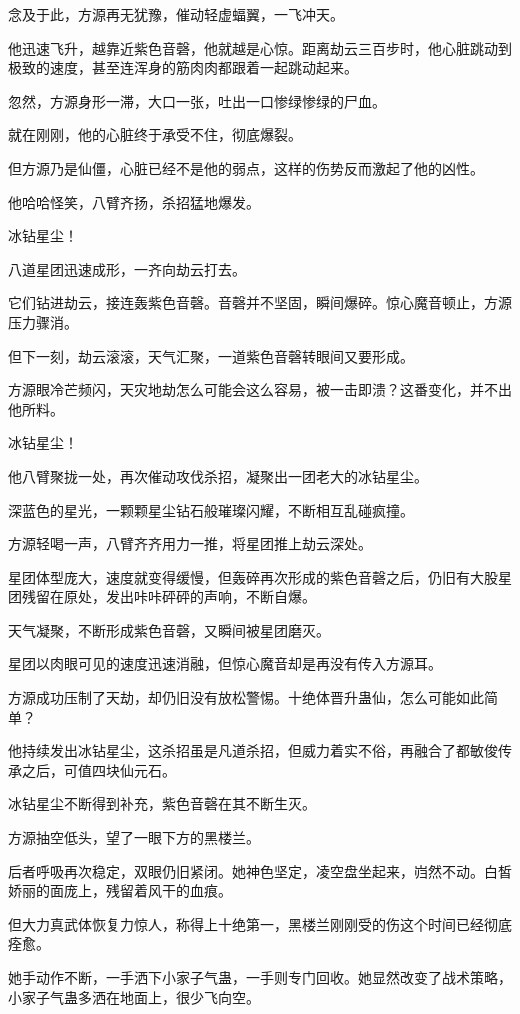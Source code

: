 \begin{this_body}
念及于此，方源再无犹豫，催动轻虚蝠翼，一飞冲天。

他迅速飞升，越靠近紫色音磬，他就越是心惊。距离劫云三百步时，他心脏跳动到极致的速度，甚至连浑身的筋肉肉都跟着一起跳动起来。

忽然，方源身形一滞，大口一张，吐出一口惨绿惨绿的尸血。

就在刚刚，他的心脏终于承受不住，彻底爆裂。

但方源乃是仙僵，心脏已经不是他的弱点，这样的伤势反而激起了他的凶性。

他哈哈怪笑，八臂齐扬，杀招猛地爆发。

冰钻星尘！

八道星团迅速成形，一齐向劫云打去。

它们钻进劫云，接连轰紫色音磬。音磬并不坚固，瞬间爆碎。惊心魔音顿止，方源压力骤消。

但下一刻，劫云滚滚，天气汇聚，一道紫色音磬转眼间又要形成。

方源眼冷芒频闪，天灾地劫怎么可能会这么容易，被一击即溃？这番变化，并不出他所料。

冰钻星尘！

他八臂聚拢一处，再次催动攻伐杀招，凝聚出一团老大的冰钻星尘。

深蓝色的星光，一颗颗星尘钻石般璀璨闪耀，不断相互乱碰疯撞。

方源轻喝一声，八臂齐齐用力一推，将星团推上劫云深处。

星团体型庞大，速度就变得缓慢，但轰碎再次形成的紫色音磬之后，仍旧有大股星团残留在原处，发出咔咔砰砰的声响，不断自爆。

天气凝聚，不断形成紫色音磬，又瞬间被星团磨灭。

星团以肉眼可见的速度迅速消融，但惊心魔音却是再没有传入方源耳。

方源成功压制了天劫，却仍旧没有放松警惕。十绝体晋升蛊仙，怎么可能如此简单？

他持续发出冰钻星尘，这杀招虽是凡道杀招，但威力着实不俗，再融合了都敏俊传承之后，可值四块仙元石。

冰钻星尘不断得到补充，紫色音磬在其不断生灭。

方源抽空低头，望了一眼下方的黑楼兰。

后者呼吸再次稳定，双眼仍旧紧闭。她神色坚定，凌空盘坐起来，岿然不动。白皙娇丽的面庞上，残留着风干的血痕。

但大力真武体恢复力惊人，称得上十绝第一，黑楼兰刚刚受的伤这个时间已经彻底痊愈。

她手动作不断，一手洒下小家子气蛊，一手则专门回收。她显然改变了战术策略，小家子气蛊多洒在地面上，很少飞向空。


\end{this_body}
